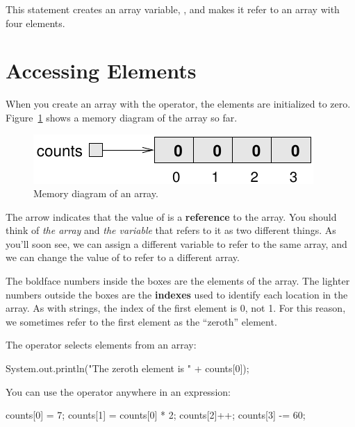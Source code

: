 This statement creates an array variable, , and makes it refer to an array with four elements.


\section{Accessing Elements}
\label{elements}

When you create an array with the  operator, the elements are initialized to zero.
Figure~\ref{fig.array} shows a memory diagram of the  array so far.

\begin{figure}[!ht]
\begin{center}
\includegraphics{figs/array.pdf}
\caption{Memory diagram of an  array.}
\label{fig.array}
\end{center}
\end{figure}


The arrow indicates that the value of  is a {\bf reference} to the array.
You should think of {\em the array} and {\em the variable} that refers to it as two different things.
As you'll soon see, we can assign a different variable to refer to the same array, and we can change the value of  to refer to a different array.


The boldface numbers inside the boxes are the elements of the array.
The lighter numbers outside the boxes are the {\bf indexes} used to identify each location in the array.
As with strings, the index of the first element is 0, not 1.
For this reason, we sometimes refer to the first element as the ``zeroth'' element.

The \java{[]} operator selects elements from an array:

\begin{code}
System.out.println("The zeroth element is " + counts[0]);
\end{code}

You can use the \java{[]} operator anywhere in an expression:

\begin{code}
counts[0] = 7;
counts[1] = counts[0] * 2;
counts[2]++;
counts[3] -= 60;
\end{code}

